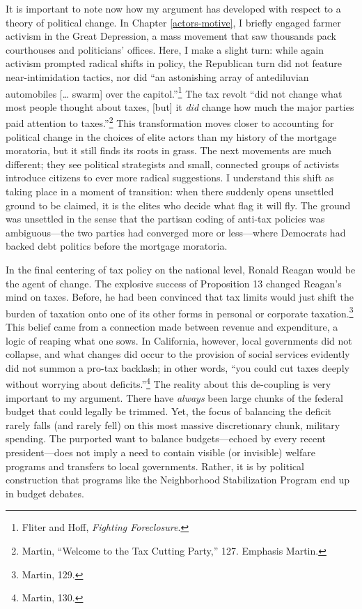 \documentclass[12pt,oneside]{psthesis}
\begin{document}
It is important to note now how my argument has developed with respect to a theory of political change.
In Chapter \ref{actors-motive}, I briefly engaged farmer activism in the Great Depression, a mass movement that saw thousands pack courthouses and politicians' offices.
Here, I make a slight turn: while again activism prompted radical shifts in policy, the Republican turn did not feature near-intimidation tactics, nor did ``an astonishing array of antediluvian automobiles {[}\ldots{} swarm{]} over the capitol.''\footnote{Fliter and Hoff, \emph{Fighting Foreclosure}.}
The tax revolt ``did not change what most people thought about taxes, {[}but{]} it \emph{did} change how much the major parties paid attention to taxes.''\footnote{Martin, ``Welcome to the Tax Cutting Party,'' 127. Emphasis Martin.}
This transformation moves closer to accounting for political change in the choices of elite actors than my history of the mortgage moratoria, but it still finds its roots in grass.
The next movements are much different; they see political strategists and small, connected groups of activists introduce citizens to ever more radical suggestions.
I understand this shift as taking place in a moment of transition: when there suddenly opens unsettled ground to be claimed, it is the elites who decide what flag it will fly.
The ground was unsettled in the sense that the partisan coding of anti-tax policies was ambiguous---the two parties had converged more or less---where Democrats had backed debt politics before the mortgage moratoria.

In the final centering of tax policy on the national level, Ronald Reagan would be the agent of change.
The explosive success of Proposition 13 changed Reagan's mind on taxes.
Before, he had been convinced that tax limits would just shift the burden of taxation onto one of its other forms in personal or corporate taxation.\footnote{Martin, 129.}
This belief came from a connection made between revenue and expenditure, a logic of reaping what one sows.
In California, however, local governments did not collapse, and what changes did occur to the provision of social services evidently did not summon a pro-tax backlash; in other words, ``you could cut taxes deeply without worrying about deficits.''\footnote{Martin, 130.}
The reality about this de-coupling is very important to my argument.
There have \emph{always} been large chunks of the federal budget that could legally be trimmed.
Yet, the focus of balancing the deficit rarely falls (and rarely fell) on this most massive discretionary chunk, military spending.
The purported want to balance budgets---echoed by every recent president---does not imply a need to contain visible (or invisible) welfare programs and transfers to local governments.
Rather, it is by political construction that programs like the Neighborhood Stabilization Program end up in budget debates.
\end{document}
